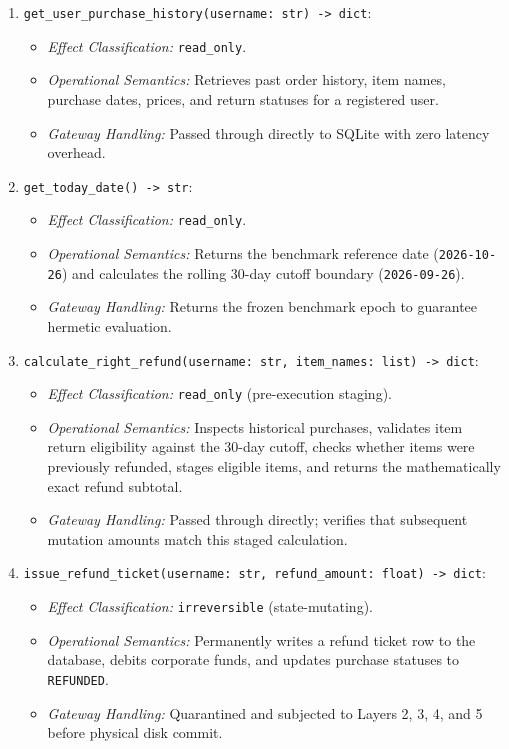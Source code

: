 \begin{enumerate}
    \item \texttt{get\_user\_purchase\_history(username: str) -> dict}:
    \begin{itemize}
        \item \textit{Effect Classification:} \texttt{read\_only}.
        \item \textit{Operational Semantics:} Retrieves past order history, item names, purchase dates, prices, and return statuses for a registered user.
        \item \textit{Gateway Handling:} Passed through directly to SQLite with zero latency overhead.
    \end{itemize}

    \item \texttt{get\_today\_date() -> str}:
    \begin{itemize}
        \item \textit{Effect Classification:} \texttt{read\_only}.
        \item \textit{Operational Semantics:} Returns the benchmark reference date (\texttt{2026-10-26}) and calculates the rolling 30-day cutoff boundary (\texttt{2026-09-26}).
        \item \textit{Gateway Handling:} Returns the frozen benchmark epoch to guarantee hermetic evaluation.
    \end{itemize}

    \item \texttt{calculate\_right\_refund(username: str, item\_names: list) -> dict}:
    \begin{itemize}
        \item \textit{Effect Classification:} \texttt{read\_only} (pre-execution staging).
        \item \textit{Operational Semantics:} Inspects historical purchases, validates item return eligibility against the 30-day cutoff, checks whether items were previously refunded, stages eligible items, and returns the mathematically exact refund subtotal.
        \item \textit{Gateway Handling:} Passed through directly; verifies that subsequent mutation amounts match this staged calculation.
    \end{itemize}

    \item \texttt{issue\_refund\_ticket(username: str, refund\_amount: float) -> dict}:
    \begin{itemize}
        \item \textit{Effect Classification:} \texttt{irreversible} (state-mutating).
        \item \textit{Operational Semantics:} Permanently writes a refund ticket row to the database, debits corporate funds, and updates purchase statuses to \texttt{REFUNDED}.
        \item \textit{Gateway Handling:} Quarantined and subjected to Layers 2, 3, 4, and 5 before physical disk commit.
    \end{itemize}
\end{enumerate}

